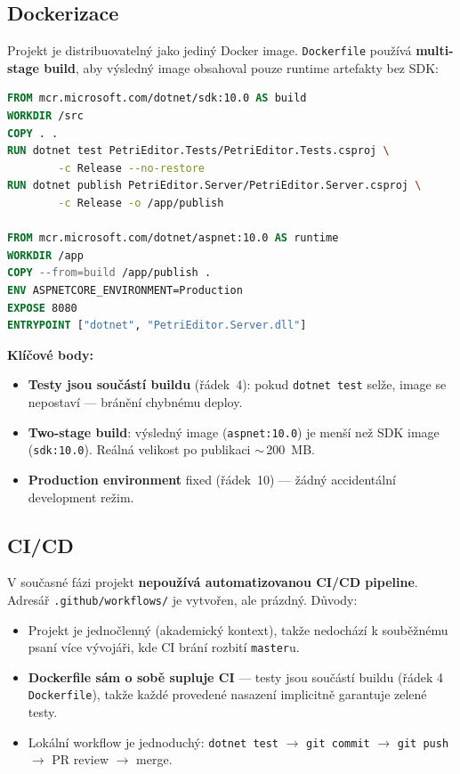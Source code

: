 \documentclass[12pt,a4paper]{article}
\begin{document}
\subsection{Dockerizace}
\label{sec:cm-docker}

Projekt je distribuovatelný jako jediný Docker image. \texttt{Dockerfile}
používá \textbf{multi-stage build}, aby výsledný image obsahoval pouze
runtime artefakty bez SDK:

\begin{lstlisting}[language=Dockerfile]
FROM mcr.microsoft.com/dotnet/sdk:10.0 AS build
WORKDIR /src
COPY . .
RUN dotnet test PetriEditor.Tests/PetriEditor.Tests.csproj \
        -c Release --no-restore
RUN dotnet publish PetriEditor.Server/PetriEditor.Server.csproj \
        -c Release -o /app/publish

FROM mcr.microsoft.com/dotnet/aspnet:10.0 AS runtime
WORKDIR /app
COPY --from=build /app/publish .
ENV ASPNETCORE_ENVIRONMENT=Production
EXPOSE 8080
ENTRYPOINT ["dotnet", "PetriEditor.Server.dll"]
\end{lstlisting}

\textbf{Klíčové body:}
\begin{itemize}
    \item \textbf{Testy jsou součástí buildu} (řádek~4): pokud
          \texttt{dotnet test} selže, image se nepostaví — bránění
          chybnému deploy.
    \item \textbf{Two-stage build}: výsledný image (\texttt{aspnet:10.0})
          je menší než SDK image (\texttt{sdk:10.0}). Reálná velikost
          po publikaci $\sim$\,200~MB.
    \item \textbf{Production environment} fixed (řádek~10) — žádný
          accidentální development režim.
\end{itemize}

\subsection{CI/CD}

V současné fázi projekt \textbf{nepoužívá automatizovanou CI/CD pipeline}.
Adresář \texttt{.github/workflows/} je vytvořen, ale prázdný. Důvody:

\begin{itemize}
    \item Projekt je jednočlenný (akademický kontext), takže nedochází
          k souběžnému psaní více vývojáři, kde CI brání rozbití
          \texttt{master}u.
    \item \textbf{Dockerfile sám o sobě supluje CI} — testy jsou
          součástí buildu (řádek 4 \texttt{Dockerfile}), takže každé
          provedené nasazení implicitně garantuje zelené testy.
    \item Lokální workflow je jednoduchý:
          \texttt{dotnet test} $\to$ \texttt{git commit} $\to$
          \texttt{git push} $\to$ PR review $\to$ merge.
\end{itemize}
\end{document}
